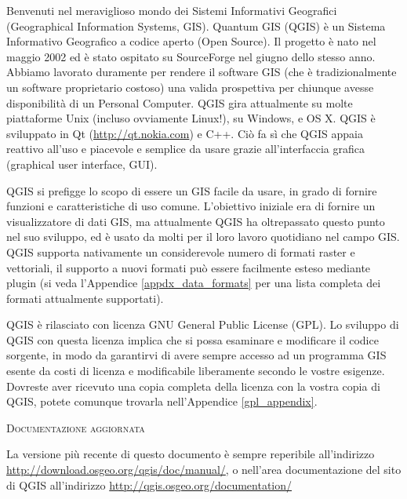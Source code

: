 \mainmatter
\pagestyle{scrheadings}
\label{label_forward}
\setcounter{page}{1}


Benvenuti nel meraviglioso mondo dei Sistemi Informativi Geografici (Geographical 
Information Systems, GIS). Quantum GIS (QGIS) è un Sistema Informativo Geografico 
a codice aperto (Open Source). Il progetto è nato nel maggio 2002 ed è stato 
ospitato su SourceForge nel giugno dello stesso anno. Abbiamo lavorato duramente 
per rendere il software GIS (che è tradizionalmente un software proprietario costoso) 
una valida prospettiva per chiunque avesse disponibilità di un Personal Computer. 
QGIS gira attualmente su molte piattaforme Unix (incluso ovviamente Linux!), su 
Windows, e OS X. QGIS è sviluppato in Qt  (\url{http://qt.nokia.com}) e C++. Ciò 
fa sì che QGIS appaia reattivo all’uso e piacevole e semplice da usare grazie 
all’interfaccia grafica (graphical user interface, GUI).

QGIS si prefigge lo scopo di essere un GIS facile da usare, in grado di fornire 
funzioni e caratteristiche di uso comune. L’obiettivo iniziale era di fornire un 
visualizzatore di dati GIS, ma attualmente QGIS ha oltrepassato questo punto nel 
suo sviluppo, ed è usato da molti per il loro lavoro quotidiano nel campo GIS. 
QGIS supporta nativamente un considerevole numero di formati raster e vettoriali, 
il supporto a nuovi formati può essere facilmente esteso mediante plugin (si veda 
l’Appendice \ref{appdx_data_formats} per una lista completa dei formati attualmente 
supportati).

QGIS è rilasciato con licenza GNU General Public License (GPL). Lo sviluppo di QGIS 
con questa licenza implica che si possa esaminare e modificare il codice sorgente, 
in modo da garantirvi di avere sempre accesso ad un programma GIS esente da costi 
di licenza e modificabile liberamente secondo le vostre esigenze. Dovreste aver 
ricevuto una copia completa della licenza con la vostra copia di QGIS, potete 
comunque trovarla nell’Appendice \ref{gpl_appendix}.  

\begin{Tip}\caption{\textsc{Documentazione aggiornata}}
La versione più recente di questo documento è sempre reperibile all’indirizzo
\url{http://download.osgeo.org/qgis/doc/manual/}, o nell’area documentazione 
del sito di QGIS all’indirizzo \url{http://qgis.osgeo.org/documentation/}
\end{Tip}

